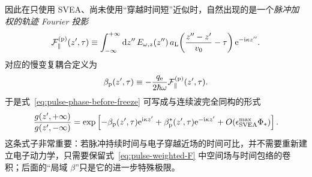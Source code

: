 因此在只使用 SVEA、尚未使用“穿越时间短”近似时，自然出现的是一个\emph{脉冲加权的轨迹 Fourier 投影}
\begin{equation}
{
\mathcal F_{\parallel}^{({\rm p})}(z',\tau)
\equiv
\int_{-\infty}^{+\infty}\mathrm{d}z''\,
E_{\omega,z}(z'')\,
 a_{\rm L}\!\left(\frac{z''-z'}{v_0}-\tau\right)
\mathrm{e}^{-\mathrm{i}\kappa z''}.}
\label{eq:pulse-weighted-F}
\end{equation}
对应的慢变复耦合定义为
\begin{equation}
{
\beta_{\rm p}(z',\tau)
\equiv-\frac{q_{\rm e}}{2\hbar\omega}
\mathcal F_{\parallel}^{({\rm p})}(z',\tau).}
\label{eq:pulse-weighted-beta}
\end{equation}
于是式~\cref{eq:pulse-phase-before-freeze} 可写成与连续波完全同构的形式
\begin{equation}
{
\frac{g(z',+\infty)}{g(z',-\infty)}
=
\exp\left[
-\beta_{\rm p}(z',\tau)\mathrm{e}^{\mathrm{i}\kappa z'}
+\beta_{\rm p}^*(z',\tau)\mathrm{e}^{-\mathrm{i}\kappa z'}
+O(\epsilon_{\rm SVEA}^{\max}\Phi_*)
\right].}
\label{eq:pulse-phase-beta-exact-svea}
\end{equation}
这条式子非常重要：若脉冲持续时间与电子穿越近场的时间可比，并不需要重新建立电子动力学，只需要保留式~\cref{eq:pulse-weighted-F} 中空间场与时间包络的卷积；后面的“局域 $\beta$”只是它的进一步特殊极限。

